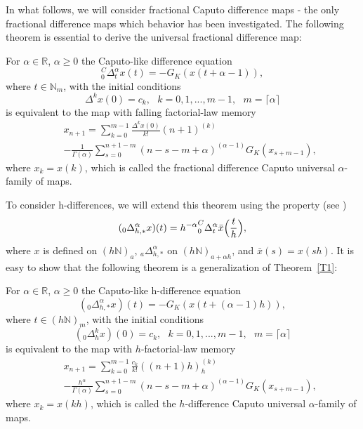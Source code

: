 \documentclass[graybox]{svmult}
\begin{document}
In what follows, we will consider fractional Caputo difference maps - the only fractional difference maps which behavior has been investigated.  
The following theorem \cite{DifSum,ME8,ME9,Fall} is essential to derive the universal fractional difference map:
\begin{theorem}
 For $\alpha \in \mathbb{R}$, $\alpha \ge 0$ the Caputo-like 
difference equation 
\begin{equation}
_0^C\Delta^{\alpha}_t x(t) = -G_K(x(t+\alpha-1)),
\label{LemmaDif_n}
\end{equation}
where $t\in \mathbb{N}_{m}$, with the initial conditions 
 \begin{equation}
\Delta^{k} x(0) = c_k, \ \ \ k=0, 1, ..., m-1, \ \ \ 
m=\lceil \alpha \rceil
\label{LemmaDifICn}
\end{equation}
is equivalent to the map with falling factorial-law memory
{\setlength\arraycolsep{0.5pt}   
\begin{eqnarray} 
&&x_{n+1} =   \sum^{m-1}_{k=0}\frac{\Delta^{k}x(0)}{k!}(n+1)^{(k)} 
\nonumber \\
&&-\frac{1}{\Gamma(\alpha)}  
\sum^{n+1-m}_{s=0}(n-s-m+\alpha)^{(\alpha-1)} 
G_K(x_{s+m-1}), 
\label{FalFacMap}
\end{eqnarray}
}
where $x_k=x(k)$, 
which is called the fractional difference Caputo universal  
$\alpha$-family of maps.
\label{T1}
\end{theorem}

To consider h-differences, we will extend this theorem using the property
(see \cite{hdif3}) 
\begin{equation}
(_0\Delta^{\alpha}_{h,*} x)(t)={h^{-\alpha}} _0^C\Delta^{\alpha}_t   \bar{x}\Bigl( \frac{t}{h} \Bigr),
\label{hNonh}
\end{equation}
where $x$ 
is defined on
$(h\mathbb{N})_a$,  $_a\Delta^{\alpha}_{h,*}$ on  
$(h\mathbb{N})_{a+\alpha h}$, and  $\bar{x}(s)=x(sh)$.
It is easy to show that the following theorem is a generalization of Theorem~\ref{T1}:


\begin{theorem}
 For $\alpha \in \mathbb{R}$, $\alpha \ge 0$ the Caputo-like 
h-difference equation 
\begin{equation}
(_0\Delta^{\alpha}_{h,*} x)(t) = -G_K(x(t+(\alpha-1)h)),
\label{LemmaDif_n_h}
\end{equation}
where $t\in (h\mathbb{N})_{m}$, with the initial conditions 
 \begin{equation}
(_0\Delta^{k}_h x)(0) = c_k, \ \ \ k=0, 1, ..., m-1, \ \ \ 
m=\lceil \alpha \rceil
\label{LemmaDifICn_h}
\end{equation}
is equivalent to the map with $h$-factorial-law memory
{\setlength\arraycolsep{0.5pt}   
\begin{eqnarray} 
&&x_{n+1} =   \sum^{m-1}_{k=0}\frac{c_k}{k!}((n+1)h)^{(k)}_h 
\nonumber \\
&&-\frac{h^{\alpha}}{\Gamma(\alpha)}  
\sum^{n+1-m}_{s=0}(n-s-m+\alpha)^{(\alpha-1)} 
G_K(x_{s+m-1}), 
\label{FalFacMap_h}
\end{eqnarray}
}
where $x_k=x(kh)$, 
which is called the $h$-difference Caputo universal  
$\alpha$-family of maps.
\label{T2}
\end{theorem}
\end{document}
